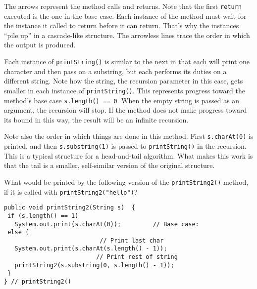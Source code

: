 \noindent The arrows represent the method calls and returns.  Note that the
first {\tt return} executed is the one in the base case.  Each
instance of the method must wait for the instance it called to return
before it can return.  That's why the instances ``pile up'' in a
cascade-like structure.  The arrowless lines trace the order in which
the output is produced.


Each instance of {\tt printString()} is similar to the next in that
each will print one character and then pass on a substring, but each
performs its duties on a different string.  Note how the string, the
recursion parameter in this case, gets smaller in each instance of
{\tt printString()}.   This
represents progress toward the method's base case {\tt s.length() ==
0}.  When the empty string is passed as an argument, the recursion
will stop.  If the method does not make progress toward its bound in
this way, the result will be an infinite recursion.



\noindent Note also the order in which things are done in this method.
First {\tt s.charAt(0)} is printed, and then {\tt s.substring(1)} is
passed to {\tt printString()} in the recursion.  This is a typical
structure for a head-and-tail algorithm. What makes this work is
that the tail is a smaller, self-similar version of the original
structure.


\pagebreak
{}
\label{self-study-exercise}
\begin{SSTUDY}

\item  What would be printed by the following 
version of the {\tt printString2()}
method, if it is called with {\tt printString2("hello")}?

\begin{jjjlisting}
\begin{lstlisting}
public void printString2(String s)  {
 if (s.length() == 1)
   System.out.print(s.charAt(0));         // Base case:
 else {
                           // Print last char
   System.out.print(s.charAt(s.length() - 1)); 
                          // Print rest of string
   printString2(s.substring(0, s.length() - 1));  
 }
} // printString2()
\end{lstlisting}
\end{jjjlisting}

\end{SSTUDY}

